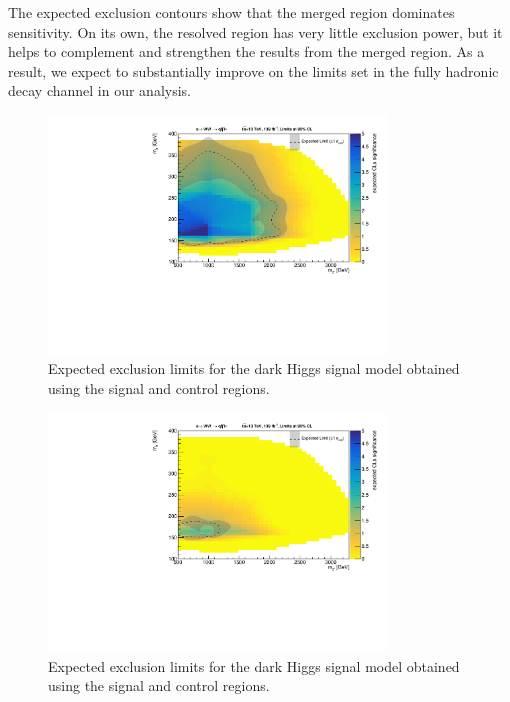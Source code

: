 The expected exclusion contours show that the merged region dominates sensitivity. On its own, the resolved region has very little exclusion power, but it helps to complement and strengthen the results from the merged region. As a result, we expect to substantially improve on the limits set in the fully hadronic decay channel in our analysis.

\begin{figure}[h]
    \centering
    \includegraphics[width=0.8\textwidth]{Figures/5/fits/MERGED.pdf}
    \caption{Expected exclusion limits for the dark Higgs signal model obtained using the \merged signal and control regions.}
    \label{fig:excl_mgd}
\end{figure}

\begin{figure}[h]
    \centering
    \includegraphics[width=0.8\textwidth]{Figures/5/fits/RESOLVED.pdf}
    \caption{Expected exclusion limits for the dark Higgs signal model obtained using the \resolved signal and control regions.}
    \label{fig:excl_res}
\end{figure}

